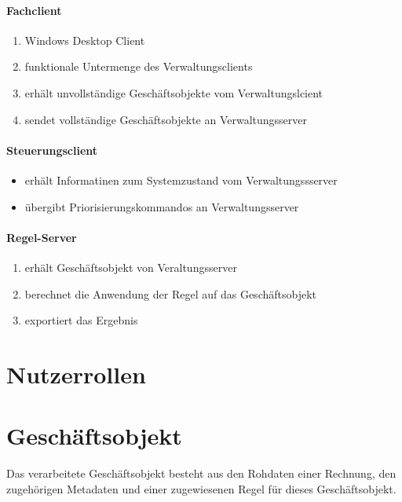 %
\paragraph*{Fachclient}
\begin{enumerate}
\item Windows Desktop Client
\item funktionale Untermenge des Verwaltungsclients
\item erhält unvollständige Geschäftsobjekte vom Verwaltungslcient
\item sendet vollständige Geschäftsobjekte an Verwaltungsserver
\end{enumerate}

%
\paragraph*{Steuerungsclient}

\begin{itemize}
\item erhält Informatinen zum Systemzustand vom Verwaltungssserver
\item übergibt Priorisierungskommandos an Verwaltungsserver
\end{itemize}

%
\paragraph*{Regel-Server}
\begin{enumerate}
\item erhält Geschäftsobjekt von Veraltungsserver
\item berechnet die Anwendung der Regel auf das Geschäftsobjekt
\item exportiert das Ergebnis
\end{enumerate}


%
\section{Nutzerrollen}



\section{Geschäftsobjekt}
Das verarbeitete Geschäftsobjekt besteht aus den Rohdaten einer Rechnung, den zugehörigen Metadaten und einer zugewiesenen Regel für
dieses Geschäftsobjekt.